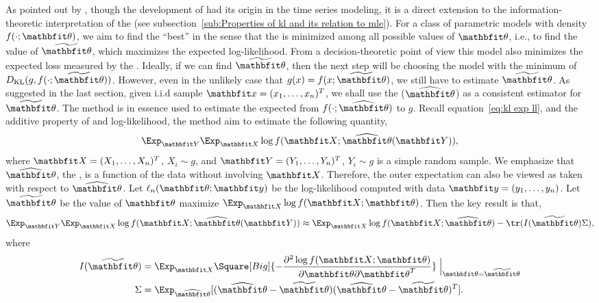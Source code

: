 As pointed out by \textcite{Bozdogan1987}, though the development of \aic had
its origin in the time series modeling, it is a direct extension to the
information-theoretic interpretation of the \mle (see
subsection~\ref{sub:Properties of kl and its relation to mle}). For a class of
parametric models with density $f(\cdot;\bth)$, we aim to find the ``best'' in
the sense that the \kl is minimized among all possible values of $\bth$, i.e.,
to find the value of $\tbth$, which maximizes the expected log-likelihood. From
a decision-theoretic point of view this model also minimizes the expected loss
measured by the \kl \parencite{Akaike1973}. Ideally, if we can find $\tbth$,
then the next step will be choosing the model with the minimum of
$D_{\mathrm{KL}}(g,f(\cdot;\tbth))$. However, even in the unlikely case that
$g(x) = f(x;\tbth)$, we still have to estimate $\tbth$. As suggested in the
last section, given i.i.d sample $\bfx = (x_1,\dots,x_n)^T$, we shall use the
\mle ($\hbth$) as a consistent estimator for $\tbth$. The \aic method is in
essence used to estimate the expected \kl from $f(\cdot; \hbth)$ to $g$.
Recall equation~\eqref{eq:kl exp ll}, and the additive property of \kl and
log-likelihood, the \aic method aim to estimate the following quantity,
\begin{equation}
  \Exp_{\bfY}\Exp_{\bfX}\log f(\bfX;\hbth(\bfY)),
\end{equation}
where $\bfX = (X_1,\dots,X_n)^T$, $X_i \sim g$, and $\bfY =
(Y_1,\dots,Y_n)^T$, $Y_i \sim g$ is a simple random sample. We emphasize that
$\hbth$, the \mle, is a function of the data without involving $\bfX$.
Therefore, the outer expectation can also be viewed as taken with respect to
$\hbth$. Let $\ell_n(\bth;\bfy)$ be the log-likelihood computed with data
$\bfy = (y_1,\dots,y_n)$. Let $\tbth$ be the value of $\bth$ maximize
$\Exp_{\bfX}\log f(\bfX;\bth)$. Then the key result is that,
\begin{equation}
  \Exp_{\bfY}\Exp_{\bfX}\log f(\bfX;\hbth(\bfY))
  \approx \Exp_{\bfX}\log f(\bfX;\hbth) - \tr(I(\tbth)\Sigma),
  \label{eq:aic general}
\end{equation}
where
\begin{align}
  I(\tbth)
  & = \Exp_{\bfX}\Square[Big]{
    -\frac{\partial^2\log f(\bfX;\bth)}{\partial\bth\partial\bth^T}}
  \Bigm|_{\bth=\tbth} \\
  \Sigma &= \Exp_{\hbth}[(\hbth-\tbth)(\hbth-\tbth)^T].
\end{align}

